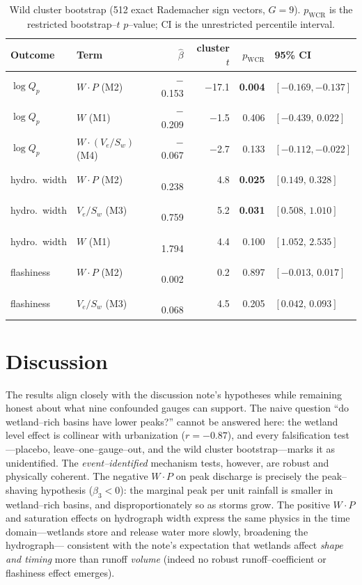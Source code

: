 \documentclass[11pt]{article}
\begin{document}
\begin{table}[htbp]\centering
\caption{Wild cluster bootstrap (512 exact Rademacher sign vectors, $G=9$). $p_{\text{WCR}}$
is the restricted bootstrap--$t$ $p$--value; CI is the unrestricted percentile interval.}
\label{tab:wcb}
\small
\begin{tabular}{llrrrl}
\toprule
Outcome & Term & $\hat\beta$ & cluster $t$ & $p_{\text{WCR}}$ & 95\% CI \\
\midrule
$\log Q_p$      & $W\!\cdot\!P$ (M2)          & $-$0.153 & $-$17.1 & \textbf{0.004} & $[-0.169,-0.137]$ \\
$\log Q_p$      & $W$ (M1)                    & $-$0.209 & $-$1.5  & 0.406 & $[-0.439,\,0.022]$ \\
$\log Q_p$      & $W\!\cdot\!(V_e/S_w)$ (M4)  & $-$0.067 & $-$2.7  & 0.133 & $[-0.112,-0.022]$ \\
hydro.\ width   & $W\!\cdot\!P$ (M2)          & $\phantom{-}$0.238 & 4.8 & \textbf{0.025} & $[0.149,\,0.328]$ \\
hydro.\ width   & $V_e/S_w$ (M3)              & $\phantom{-}$0.759 & 5.2 & \textbf{0.031} & $[0.508,\,1.010]$ \\
hydro.\ width   & $W$ (M1)                    & $\phantom{-}$1.794 & 4.4 & 0.100 & $[1.052,\,2.535]$ \\
flashiness      & $W\!\cdot\!P$ (M2)          & $\phantom{-}$0.002 & 0.2 & 0.897 & $[-0.013,\,0.017]$ \\
flashiness      & $V_e/S_w$ (M3)              & $\phantom{-}$0.068 & 4.5 & 0.205 & $[0.042,\,0.093]$ \\
\bottomrule
\end{tabular}
\end{table}

\section{Discussion}
The results align closely with the discussion note's hypotheses while remaining honest about
what nine confounded gauges can support. The naive question ``do wetland--rich basins have
lower peaks?'' cannot be answered here: the wetland level effect is collinear with
urbanization ($r=-0.87$), and every falsification test---placebo, leave--one--gauge--out, and
the wild cluster bootstrap---marks it as unidentified. The \emph{event--identified} mechanism
tests, however, are robust and physically coherent. The negative $W\!\cdot\!P$ on peak
discharge is precisely the peak--shaving hypothesis ($\beta_3<0$): the marginal peak per unit
rainfall is smaller in wetland--rich basins, and disproportionately so as storms grow. The
positive $W\!\cdot\!P$ and saturation effects on hydrograph width express the same physics in
the time domain---wetlands store and release water more slowly, broadening the hydrograph---
consistent with the note's expectation that wetlands affect \emph{shape and timing} more than
runoff \emph{volume} (indeed no robust runoff--coefficient or flashiness effect emerges).
\end{document}
